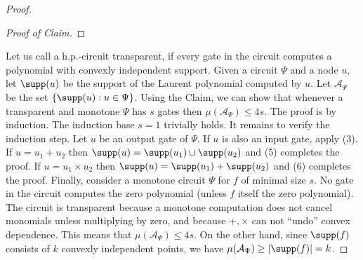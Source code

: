 \begin{proof}
\begin{proof}[Proof of Claim]
\end{proof}
Let us call a h.p.-circuit transparent, if every gate in the circuit computes a polynomial with convexly independent support. Given a circuit $\Psi$ and a node $u$, let $\supp(u)$ be the support of the Laurent polynomial computed by $u$. Let $\mathcal A_\Psi$ be the set $\{\supp(u):u\in\Psi\}$.
Using the Claim, we can show that whenever a transparent and monotone $\Psi$ has $s$ gates then $\mu(\mathcal A_\Psi)\le4s$. The proof is by induction. The induction base $s=1$ trivially holds. It remains to verify the induction step. Let $u$ be an output gate of $\Psi$. If $u$ is also an input gate, apply (3).
If $u=u_1+u_2$ then $\supp(u)=\supp(u_1)\cup\supp(u_2)$ and (5) completes the proof.
If $u=u_1\times u_2$ then $\supp(u)=\supp(u_1)+\supp(u_2)$ and (6) completes the proof.
Finally, consider a monotone circuit $\Psi$ for $f$ of minimal size $s$. No gate in the circuit computes the zero polynomial (unless $f$ itself the zero polynomial). The circuit is transparent because a monotone computation does not cancel monomials unless multiplying by zero, and because $+,\times$ can not ``undo'' convex dependence. This means that $\mu(\mathcal A_\Psi)\le4s$. On the other hand, since $\supp(f)$ consists of $k$ convexly independent points, we have $\mu(\mathcal A_\Psi)\ge|\supp(f)|=k$.
\end{proof}
